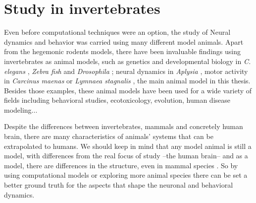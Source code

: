 \section{Study in invertebrates}
\label{c-intro-invertebrates}
Even before computational techniques were an option, the study of Neural dynamics and behavior was carried using many different model animals. Apart from the hegemonic rodents models, there have been invaluable findings using invertebrates as animal models, such as genetics and developmental biology in \textit{C. elegans} \parencite{brenner_genetics_1974}, \textit{Zebra fish} \parencite{streisinger_production_1981} and \textit{Drosophila} \parencite{nusslein-volhard_mutations_1980}; neural dynamics in \textit{Aplysia} \parencite{HODGKIN1952,wachtel_direct_1967}, motor activity in \textit{Carcinus maenas} \parencite{eisen_mechanisms_1982} or \textit{Lymnaea stagnalis} \parencite{Benjamin1979b}, the main animal model in this thesis. Besides those examples, these animal models have been used for a wide variety of fields including behavioral studies, ecotoxicology, evolution, human disease modeling... \parencite{romanova_animal_2018} 

Despite the differences between invertebrates, mammals and concretely human brain, there are many characteristics of animals' systems that can be extrapolated to humans. We should keep in mind that any model animal is still a model, with differences from the real focus of study --the human brain-- and as a model, there are differences in the structure, even in mammal species \parencite{preuss_taking_2000}. So by using computational models or exploring more animal species there can be set a better ground truth for the aspects that shape the neuronal and behavioral dynamics. 


